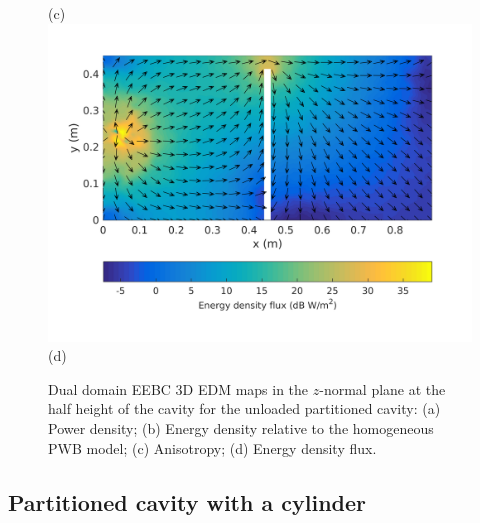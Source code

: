 \documentclass[a4paper]{article}
\numberwithin{equation}{section}
\begin{document}
\begin{figure}[hp]
\begin{center}
{\footnotesize (c)}\\
\vspace{2mm}
\includegraphics[trim={0 8mm 0 12mm},clip,width=0.52\linewidth]{figures/DDM-EEBC_3D_DU_EnergyDensityFluxMap}\\
{\footnotesize (d)}\\
\vspace{-2mm}
\caption{\label{fg:partemptyddm_maps} Dual domain EEBC 3D EDM maps in the $z$-normal plane at the half height of the cavity for the 
unloaded partitioned cavity: (a) Power density; (b) Energy density relative to the homogeneous PWB model;
(c) Anisotropy; (d) Energy density flux.}
\end{center}
\end{figure}

\subsection[Partitioned cavity with a cylinder]{Partitioned cavity with a cylinder}
\label{sc:res:cylpart}
\end{document}
